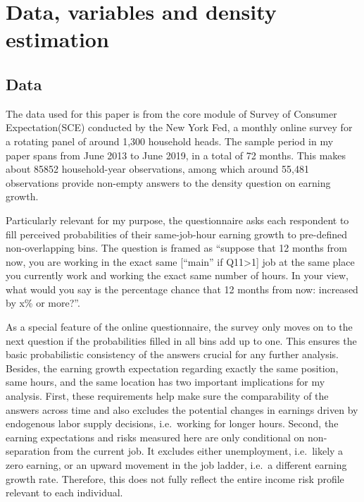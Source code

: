 \documentclass[12pt,notitlepage,onecolumn,aps,pra]{article}
\begin{document}
    \hypertarget{data-variables-and-density-estimation}{%
\section{Data, variables and density
estimation}\label{data-variables-and-density-estimation}}

\hypertarget{data}{%
\subsection{Data}\label{data}}

The data used for this paper is from the core module of Survey of
Consumer Expectation(SCE) conducted by the New York Fed, a monthly
online survey for a rotating panel of around 1,300 household heads. The
sample period in my paper spans from June 2013 to June 2019, in a total
of 72 months. This makes about 85852 household-year observations, among
which around 55,481 observations provide non-empty answers to the
density question on earning growth.

Particularly relevant for my purpose, the questionnaire asks each
respondent to fill perceived probabilities of their same-job-hour
earning growth to pre-defined non-overlapping bins. The question is
framed as ``suppose that 12 months from now, you are working in the
exact same {[}``main'' if Q11\textgreater1{]} job at the same place you
currently work and working the exact same number of hours. In your view,
what would you say is the percentage chance that 12 months from now:
increased by x\% or more?''.

As a special feature of the online questionnaire, the survey only moves
on to the next question if the probabilities filled in all bins add up
to one. This ensures the basic probabilistic consistency of the answers
crucial for any further analysis. Besides, the earning growth
expectation regarding exactly the same position, same hours, and the
same location has two important implications for my analysis. First,
these requirements help make sure the comparability of the answers
across time and also excludes the potential changes in earnings driven
by endogenous labor supply decisions, i.e.~working for longer hours.
Second, the earning expectations and risks measured here are only
conditional on non-separation from the current job. It excludes either
unemployment, i.e.~likely a zero earning, or an upward movement in the
job ladder, i.e.~a different earning growth rate. Therefore, this does
not fully reflect the entire income risk profile relevant to each
individual.
\end{document}

